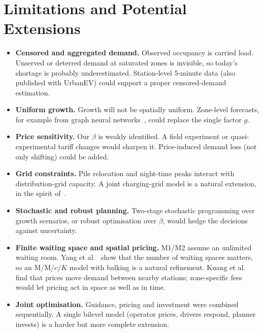 \documentclass[11pt,a4paper]{article}
\begin{document}
\section{Limitations and Potential Extensions}\label{sec:limits}
\begin{itemize}[leftmargin=1.3em,itemsep=1pt]
\item \textbf{Censored and aggregated demand.} Observed occupancy is carried load. Unserved or deterred demand at saturated zones is invisible, so today's shortage is probably underestimated. Station-level 5-minute data (also published with UrbanEV) could support a proper censored-demand estimation.
\item \textbf{Uniform growth.} Growth will not be spatially uniform. Zone-level forecasts, for example from graph neural networks~\cite{qu2024}, could replace the single factor $g$.
\item \textbf{Price sensitivity.} Our $\beta$ is weakly identified. A field experiment or quasi-experimental tariff changes would sharpen it. Price-induced demand loss (not only shifting) could be added.
\item \textbf{Grid constraints.} Pile relocation and night-time peaks interact with distribution-grid capacity. A joint charging-grid model is a natural extension, in the spirit of~\cite{he2013}.
\item \textbf{Stochastic and robust planning.} Two-stage stochastic programming over growth scenarios, or robust optimisation over $\beta$, would hedge the decisions against uncertainty.
\item \textbf{Finite waiting space and spatial pricing.} M1/M2 assume an unlimited waiting room. Yang et al.~\cite{yang2017} show that the number of waiting spaces matters, so an M/M/$c$/$K$ model with balking is a natural refinement. Kuang et al.~\cite{kuang2024} find that prices move demand between nearby stations; zone-specific fees would let pricing act in space as well as in time.
\item \textbf{Joint optimisation.} Guidance, pricing and investment were combined sequentially. A single bilevel model (operator prices, drivers respond, planner invests) is a harder but more complete extension.
\end{itemize}

\end{document}
